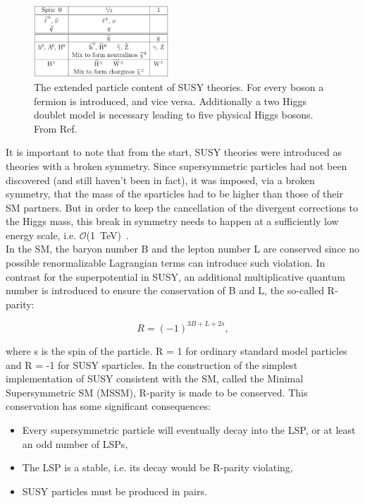 \begin{figure}[h!t]
  \begin{center}
       \includegraphics[width=0.45\textwidth,]{figures/sparticleTable.png}
       \caption{The extended particle content of SUSY theories. For every boson a fermion
       is introduced, and vice versa. Additionally a two Higgs doublet model is necessary 
       leading to five physical Higgs bosons. From Ref.~\cite{Martin:1997ns}}
    \label{fig:sparticleTable}
  \end{center}
\end{figure}

It is important to note that from the start, SUSY theories were introduced as theories with a 
broken symmetry. Since supersymmetric particles had not been discovered (and still haven't been in fact), 
it was imposed, via a broken symmetry, that the mass of the sparticles had to be higher than 
those of their SM partners. But in order to keep the cancellation of the divergent corrections to 
the Higgs mass, this break in symmetry needs to happen at a sufficiently low energy scale, 
i.e. $\mathcal{O}$(1~TeV)~\cite{ramond1999journeys}.\\
\indent In the SM, the baryon number B and the lepton number L are conserved since no possible 
renormalizable Lagrangian terms can introduce such violation. In contrast for the superpotential in 
SUSY, an additional multiplicative quantum number is introduced to ensure the conservation of B and L, the so-called R-parity:

\begin{equation}
\label{eq:r-par}
R = \left(-1\right)^{3B+L+2s},
\end{equation}

where s is the spin of the particle. R = 1 for ordinary standard model particles and R = -1 for SUSY sparticles.
In the construction of the simplest implementation of SUSY consistent with the SM, called the Minimal 
Supersymmetric SM (MSSM), R-parity is made to be conserved. This conservation has some significant consequences:

\begin{itemize}
\item{Every supersymmetric particle will eventually decay into the LSP, or at least an odd
number of LSPs,}
\item{The LSP is a stable, i.e. its decay would be R-parity violating,}
\item{SUSY particles must be produced in pairs.}
\end{itemize}

